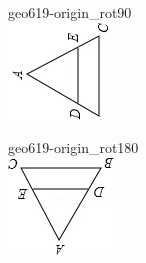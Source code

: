 \documentclass[12pt]{article}
\begin{document}
\begin{center}
\begin{minipage}{0.32\textwidth}
\end{minipage}
\hfill\begin{minipage}{0.32\textwidth}\centering
geo619-origin\_rot90\\
\includegraphics[width=0.95\linewidth]{out_rommath_origin/items/geo619-origin/assets/figure_rot90.png}
\end{minipage}
\par\medskip
\begin{minipage}{0.32\textwidth}\centering
geo619-origin\_rot180\\
\includegraphics[width=0.95\linewidth]{out_rommath_origin/items/geo619-origin/assets/figure_rot180.png}

\end{minipage}
\end{center}
\end{document}
